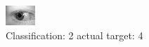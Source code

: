 \begin{figure}[h!]
\begin{center}
\includegraphics[width=0.60\columnwidth]{figures/ID837_class_2_target_4.png}
\end{center}
\caption{ Classification: 2 actual target: 4}
\label{fig:ID837_class_2_target_4}
\end{figure}
